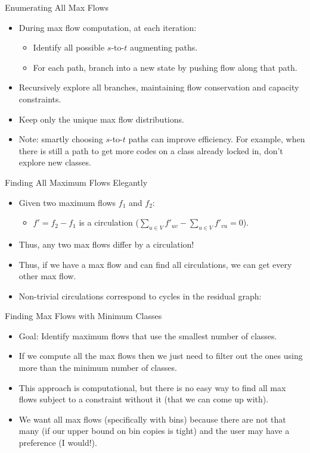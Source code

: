 \documentclass{beamer}
\begin{document}
\begin{frame}{Enumerating All Max Flows}
    \begin{itemize}
        \item During max flow computation, at each iteration:
        \begin{itemize}
            \item Identify all possible \( s \)-to-\( t \) augmenting paths.
            \item For each path, branch into a new state by pushing flow along that path.
        \end{itemize}
        \item Recursively explore all branches, maintaining flow conservation and capacity constraints.
        \item Keep only the unique max flow distributions.
        \item Note: smartly choosing \( s \)-to-\( t \) paths can improve efficiency. For example, when there is still a path to get more codes on a class already locked in, don't explore new classes. 
    \end{itemize}
\end{frame}

\begin{frame}{Finding All Maximum Flows Elegantly}
    \begin{itemize}
        \item Given two maximum flows \( f_1 \) and \( f_2 \):
        \begin{itemize}
            \item \( f' = f_2 - f_1 \) is a circulation (\( \sum_{u \in V} f'_{uv} - \sum_{u \in V} f'_{vu} = 0 \)).
        \end{itemize}
        \item Thus, any two max flows differ by a circulation!
        \item Thus, if we have a max flow and can find all circulations, we can get every other max flow.
        \item Non-trivial circulations correspond to cycles in the residual graph:
    \end{itemize}
\end{frame}

\begin{frame}{Finding Max Flows with Minimum Classes}
    \begin{itemize}
        \item Goal: Identify maximum flows that use the smallest number of classes.
        \item If we compute all the max flows then we just need to filter out the ones using more than the minimum number of classes.
        \item This approach is computational, but there is no easy way to find all max flows subject to a constraint without it (that we can come up with).
        \item We want all max flows (specifically with bins) because there are not that many (if our upper bound on bin copies is tight) and the user may have a preference (I would!).
    \end{itemize}
\end{frame}
\end{document}
